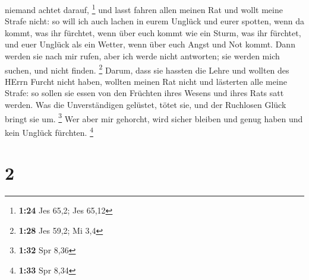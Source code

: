 niemand achtet darauf, \footnote{\textbf{1:24} Jes 65,2; Jes 65,12}
 und lasst fahren allen meinen Rat und wollt meine Strafe
nicht:  so will ich auch lachen in eurem Unglück und eurer
spotten, wenn da kommt, was ihr fürchtet,  wenn über euch
kommt wie ein Sturm, was ihr fürchtet, und euer Unglück als ein Wetter,
wenn über euch Angst und Not kommt.  Dann werden sie nach
mir rufen, aber ich werde nicht antworten; sie werden mich suchen, und
nicht finden. \footnote{\textbf{1:28} Jes 59,2; Mi 3,4} 
Darum, dass sie hassten die Lehre und wollten des HErrn Furcht nicht
haben,  wollten meinen Rat nicht und lästerten alle meine
Strafe:  so sollen sie essen von den Früchten ihres Wesens
und ihres Rats satt werden.  Was die Unverständigen
gelüstet, tötet sie, und der Ruchlosen Glück bringt sie um. \footnote{\textbf{1:32}
  Spr 8,36}  Wer aber mir gehorcht, wird sicher bleiben und
genug haben und kein Unglück fürchten. \footnote{\textbf{1:33} Spr 8,34}

\hypertarget{section-1}{%
\section{2}\label{section-1}}

